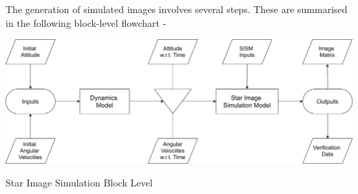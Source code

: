 \documentclass[../../main.tex]{subfiles}
\begin{document}
The generation of simulated images involves several steps. These are summarised in the following block-level flowchart -

\begin{Flowchart}[h!]
    \centering
    \includegraphics[scale=0.06]{Figures/Model/se_BLock_Level_Diagram.png}
    \caption{Star Image Simulation Block Level}
    \label{fig:SIS_Block}
\end{Flowchart}






\end{document}
